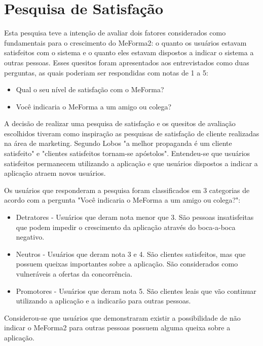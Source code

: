 \section{Pesquisa de Satisfação}

Esta pesquisa teve a intenção de avaliar dois fatores considerados como fundamentais para o crescimento do MeForma2: o quanto os usuários estavam satisfeitos com o sistema e o quanto eles estavam dispostos a indicar o sistema a outras pessoas. Esses quesitos foram apresentados aos entrevistados como duas perguntas, as quais poderiam ser respondidas com notas de 1 a 5:
\begin{itemize}
    \item Qual o seu nível de satisfação com o MeForma?
    \item Você indicaria o MeForma a um amigo ou colega?
\end{itemize}

A decisão de realizar uma pesquisa de satisfação e os quesitos de avaliação escolhidos tiveram como inspiração as pesquisas de satisfação de cliente realizadas na área de marketing. Segundo Lobos \cite{lobos} "a melhor propaganda é um cliente satisfeito" e "clientes satisfeitos tornam-se apóstolos". Entendeu-se que usuários satisfeitos permanecem utilizando a aplicação e que usuários dispostos a indicar a aplicação atraem novos usuários. 

Os usuários que responderam a pesquisa foram classificados em 3 categorias de acordo com a pergunta "Você indicaria o MeForma a um amigo ou colega?":

\begin{itemize}
    \item Detratores - Usuários que deram nota menor que 3. São pessoas insatisfeitas que podem impedir o crescimento da aplicação através do boca-a-boca negativo.
    \item Neutros - Usuários que deram nota 3 e 4. São clientes satisfeitos, mas que possuem queixas importantes sobre a aplicação. São considerados como vulneráveis a ofertas da concorrência.
    \item Promotores - Usuários que deram nota 5. São clientes leais que vão continuar utilizando a aplicação e a indicarão para outras pessoas.
\end{itemize}

Considerou-se que usuários que demonstraram existir a possibilidade de não indicar o MeForma2 para outras pessoas possuem alguma queixa sobre a aplicação.

